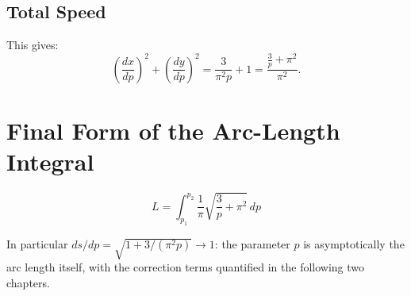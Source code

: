 \subsection*{Total Speed}
This gives:
\begin{equation}
\left(\frac{dx}{dp}\right)^2
+ \left(\frac{dy}{dp}\right)^2
= \frac{3}{\pi^2 p} + 1
= \frac{\frac{3}{p} + \pi^2}{\pi^2}.
\end{equation}

\section{Final Form of the Arc-Length Integral}

\begin{theorem}
\begin{equation}
\boxed{
L = \int_{p_1}^{p_2}
\frac{1}{\pi}\sqrt{\frac{3}{p} + \pi^2}\, dp
}
\end{equation}
\end{theorem}

In particular $ds/dp = \sqrt{1 + 3/(\pi^2 p)} \to 1$: the parameter $p$ is asymptotically the arc length itself, with the correction terms quantified in the following two chapters.
